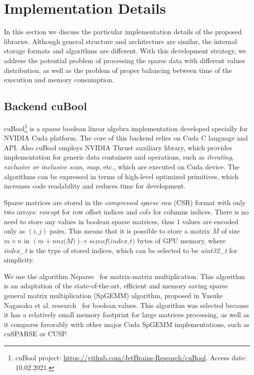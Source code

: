 \section{Implementation Details}

In this section we discuss the particular implementation details of the proposed libraries.
Although general structure and architecture are similar, the internal storage formats and algorithms are different.
With this development strategy, we address the potential problem of processing the sparse data with different values distribution, as well as the problem of proper balancing between time of the execution and memory consumption.

\subsection{Backend cuBool}

cuBool\footnote{cuBool project: \url{https://github.com/JetBrains-Research/cuBool}. Access date: 10.02.2021.}
is a sparse boolean linear algebra implementation developed specially for NVIDIA Cuda platform.
The core of this backend relies on Cuda C language and API.
Also cuBool employs NVIDIA Thrust auxiliary library, which provides implementation for generic data containers and operations, such as \textit{iterating}, \textit{exclusive or inclusive scan}, \textit{map}, etc., which are executed on Cuda device.
The algorithms can be expressed in terms of high-level optimized primitives, which increases code readability and reduces time for development.

Sparse matrices are stored in the \textit{compressed sparse row} (CSR) format with only two arrays: $rowspt$ for row offset indices and $cols$ for columns indices.
There is no need to store any values in boolean sparse matrices, thus $1$ values are encoded only as $(i, j)$ pairs.
This means that it is possible to store a matrix $M$ of size $m \times n$ in $(m + \textit{nnz(M)}) \times \textit{sizeof(index\_t)}$ bytes of GPU memory, where \textit{index\_t} is the type of stored indices, which can be selected to be \textit{uint32\_t} for simplicity.

We use the algorithm Nsparse~\cite{inproceedings:cfpq_for_redis_graph} for matrix-matrix multiplication.
This algorithm is an adaptation of the state-of-the-art, efficient and memory saving sparse general matrix multiplication (SpGEMM) algorithm, proposed in Yusuke Nagasaka et al. research~\cite{algo:spgemm:8025284} for boolean values.
This algorithm was selected because it has a relatively small memory footprint for large matrices processing, as well as it compares favorably with other major Cuda SpGEMM implementations, such as cuSPARSE or CUSP.

